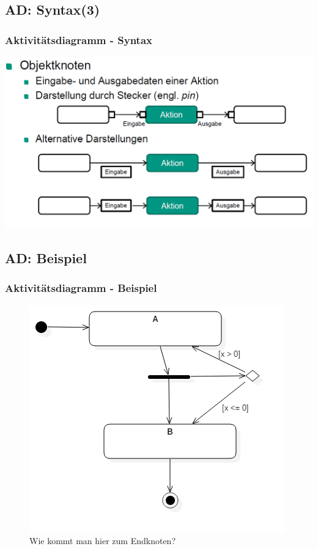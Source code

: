 \documentclass[18pt]{beamer}
\begin{document}
	\subsection{AD: Syntax(3)}
	\begin{frame}
		\frametitle{Aktivitätsdiagramm - Syntax}
		\includegraphics[scale=0.45]{./pics/tut2/act_syn3.png}
	\end{frame}

	\subsection{AD: Beispiel}
	\begin{frame}
		\frametitle{Aktivitätsdiagramm - Beispiel}
		\begin{figure}
			\centering
			\caption{Wie kommt man hier zum Endknoten?}
			\includegraphics[scale=0.4]{./pics/tut2/act_ex.png}
		\end{figure}
	\end{frame}
\end{document}
